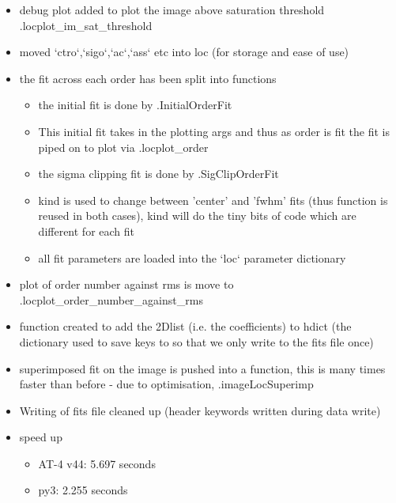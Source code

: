 \begin{itemize}
\item debug plot added to plot the image above saturation threshold \spirouPlot.locplot\_im\_sat\_threshold
        
\item moved `ctro`,`sigo`,`ac`,`ass` etc into loc (for storage and ease of use)        
        
\item the fit across each order has been split into functions
    \begin{itemize}
	\item the initial fit is done by \spirouLOCOR.InitialOrderFit
	\item This initial fit takes in the plotting args and thus as order is fit the fit is piped on to plot via \spirouPlot.locplot\_order
	\item the sigma clipping fit is done by \spirouLOCOR.SigClipOrderFit
	\item kind is used to change between 'center' and 'fwhm' fits (thus function is reused in both cases), kind will do the tiny bits of code which are different for each fit
	\item all fit parameters are loaded into the `loc` parameter dictionary
	\end{itemize}

\item plot of order number against rms is move to \spirouPlot.locplot\_order{\hskip 0pt}\_number\_against\_rms

\item function created to add the 2Dlist (i.e. the coefficients) to hdict (the dictionary used to save keys to so that we only write to the fits file once)

\item superimposed fit on the image is pushed into a function, this is many times faster than before - due to optimisation, \spirouLOCOR.imageLocSuperimp

\item Writing of fits file cleaned up (header keywords written during data write)

\item speed up
	\begin{itemize}
	\item AT-4 v44: 5.697 seconds
	\item py3:  2.255 seconds
    \end{itemize}

\end{itemize}

